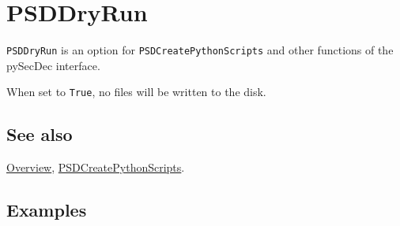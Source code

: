 \documentclass[../FeynHelpersManual.tex]{subfiles}
\begin{document}
\hypertarget{psddryrun}{
\section{PSDDryRun}\label{psddryrun}}

\texttt{PSDDryRun} is an option for \texttt{PSDCreatePythonScripts} and
other functions of the pySecDec interface.

When set to \texttt{True}, no files will be written to the disk.

\subsection{See also}

\hyperlink{toc}{Overview},
\hyperlink{psdcreatepythonscripts}{PSDCreatePythonScripts}.

\subsection{Examples}
\end{document}
